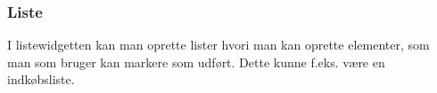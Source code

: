 \newpage
\subsubsection{Liste}

I listewidgetten kan man oprette lister hvori man kan oprette elementer, som man som bruger kan markere som udført. Dette kunne f.eks. være en indkøbsliste.\newline





